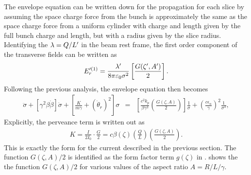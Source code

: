 The envelope equation can be written down for the propagation for each slice
by assuming the space charge force from the bunch is approximately the same as
the space charge force from a uniform cylinder with charge and length given by
the full bunch charge and length, but with a radius given by the slice radius.
Identifying the $\lambda = Q/L^{\prime}$ in the beam rest frame, the first order
component of the transverse fields can be written as
%
\begin{eqnarray}
E_r^{\prime(1)}= \frac{\lambda\primed}{8\pi\epsilon_0\sigma^2}\left[\frac{G(\zeta\primed,A\primed)}{2}\right].
\end{eqnarray}
%
Following the previous analysis, the envelope equation then becomes
%
\begin{eqnarray}
\ddot\sigma + \left[\gamma^2\beta\dot\beta\right]\dot\sigma + \left[\frac{K}{m\gamma}+(\dot\theta_r)^2\right]\sigma &=&
\left[\frac{c^2k_p}{\beta \gamma^3}\left(\frac{G(\zeta,A)}{2}\right)\right]\frac{1}{\sigma}+\left(\frac{c\epsilon_n}{\gamma}\right)^2\frac{1}{\sigma^3},
\nonumber
\end{eqnarray}
%
Explicitly, the perveance term is written out as
%
\begin{eqnarray}
K = \frac{I}{2I_0}\cdot \frac{G}{2} = c\beta(\zeta)\left(\frac{Q}{L}\right)\left(\frac{G(\zeta,A)}{2}\right).
\end{eqnarray}
%
This is exactly the form for the current described in the previous section.
The function $G(\zeta,A)/2$ is identified as the form factor term $g(\zeta)$
in .  shows the the function
$G(\zeta,A)/2$ for various values of the aspect ratio $A = R/L/\gamma$.
%
